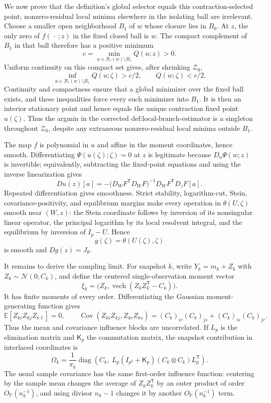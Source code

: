 We now prove that the definition's global selector equals this contraction-selected point; nonzero-residual local minima elsewhere in the isolating ball are irrelevant.  Choose a smaller open neighborhood \(B_1\) of \(w\) whose closure lies in \(B_0\).  At \(z\), the only zero of \(f(\,\cdot\,;z)\) in the fixed closed ball is \(w\).  The compact complement of \(B_1\) in that ball therefore has a positive minimum
\[
 c=\min_{u\in\mathcal B_r(w)\setminus B_1}Q(u;z)>0.
\]
Uniform continuity on this compact set gives, after shrinking \(\mathcal Z_0\),
\[
 \inf_{u\in\mathcal B_r(w)\setminus B_1}Q(u;\zeta)>c/2,
 \qquad Q(w;\zeta)<c/2.
\]
Continuity and compactness ensure that a global minimizer over the fixed ball exists, and these inequalities force every such minimizer into \(B_1\).  It is then an interior stationary point and hence equals the unique contraction fixed point \(u(\zeta)\).  Thus the argmin in the corrected \(\text{def:local-branch-estimator}\) is a singleton throughout \(\mathcal Z_0\), despite any extraneous nonzero-residual local minima outside \(B_1\).

The map \(f\) is polynomial in \(u\) and affine in the moment coordinates, hence smooth.  Differentiating \(\Psi(u(\zeta);\zeta)=0\) at \(z\) is legitimate because \(D_u\Psi(w;z)\) is invertible; equivalently, subtracting the fixed-point equations and using the inverse linearization gives
\[
 Du(z)[a]=-\bigl(D_WF^{\mathsf T}D_WF\bigr)^{-1}
 D_WF^{\mathsf T}D_zF[a].
\]
Repeated differentiation gives smoothness.  Strict stability, logarithm-cut, Stein, covariance-positivity, and equilibrium margins make every operation in \(\theta(U,\zeta)\) smooth near \((W,z)\): the Stein coordinate follows by inversion of its nonsingular linear operator, the principal logarithm by its local resolvent integral, and the equilibrium by inversion of \(I_p-U\).  Hence
\[
 g(\zeta)=\theta(U(\zeta),\zeta)
\]
is smooth and \(Dg(z)=J_\theta\).

It remains to derive the sampling limit.  For snapshot \(k\), write \(Y_k=m_k+Z_k\) with \(Z_k\sim\mathcal N(0,C_k)\), and define the centered single-observation moment vector
\[
 \xi_k=\bigl(Z_k,\operatorname{vech}(Z_kZ_k^{\mathsf T}-C_k)\bigr).
\]
It has finite moments of every order.  Differentiating the Gaussian moment-generating function gives
\[
 \mathbb E[Z_{ki}Z_{kj}Z_{k\ell}]=0,\qquad
 \operatorname{Cov}(Z_{ki}Z_{kj},Z_{kr}Z_{ks})
 =(C_k)_{ir}(C_k)_{js}+(C_k)_{is}(C_k)_{jr}.
\]
Thus the mean and covariance influence blocks are uncorrelated.  If \(L_p\) is the elimination matrix and \(\mathsf K_p\) the commutation matrix, the snapshot contribution in interlaced coordinates is
\[
 \Omega_k=\frac1{\pi_k}\operatorname{diag}\left(
 C_k,\ L_p(I_{p^2}+\mathsf K_p)(C_k\otimes C_k)L_p^{\mathsf T}\right).
\]
The usual sample covariance has the same first-order influence function: centering by the sample mean changes the average of \(Z_kZ_k^{\mathsf T}\) by an outer product of order \(O_{\mathbb P}(n_k^{-1})\), and using divisor \(n_k-1\) changes it by another \(O_{\mathbb P}(n_k^{-1})\) term.

